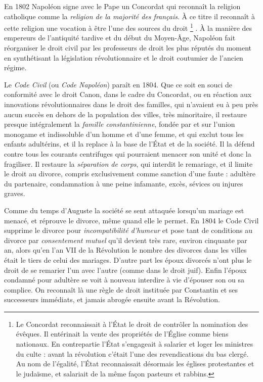 

 En 1802 Napoléon signe avec le Pape un Concordat qui reconnaît la religion catholique comme la \emph{religion de la majorité des français}. À ce titre il reconnaît à cette religion une vocation à être l'une des sources du droit%
\footnote{Le Concordat reconnaissait à l'État le droit de contrôler la nomination des évêques. Il entérinait la vente des propriétés de l'Église comme biens nationaux. En contrepartie l'État s'engageait à salarier et loger les ministres du culte : avant la révolution c'était l'une des revendications du bas clergé. Au nom de l'égalité, l'État reconnaissait désormais les églises protestantes et le judaïsme, et salariait de la même façon pasteurs et rabbins.}%
. À la manière des empereurs de l'antiquité tardive et du début du Moyen-Âge, Napoléon fait réorganiser le droit civil par les professeurs de droit les plus réputés du moment en synthétisant la législation révolutionnaire et le droit coutumier de l'ancien régime. 

 Le \emph{Code Civil} (ou \emph{Code Napoléon}) paraît en 1804. Que ce soit en souci de conformité avec le droit Canon, dans le cadre du Concordat, ou en réaction aux innovations révolutionnaires dans le droit des familles, qui n'avaient eu à peu près aucun succès en dehors de la population des villes, très minoritaire, il restaure presque intégralement la \emph{famille constantinienne}, fondée par et sur l'union monogame et indissoluble d'un homme et d'une femme, et qui exclut tous les enfants adultérins, et il la replace à la base de l'État et de la société. Il la défend contre tous les courants centrifuges qui pourraient menacer son unité et donc la fragiliser. Il restaure la \emph{séparation de corps}, qui interdit le remariage, et il limite le droit au divorce, compris exclusivement comme sanction d'une faute : adultère du partenaire, condamnation à une peine infamante, excès, sévices ou injures graves. 

 Comme du temps d'Auguste la société se sent attaquée lorsqu'un mariage est menacé, et réprouve le divorce, même quand elle le permet. En 1804 le Code Civil supprime le divorce pour \emph{incompatibilité d'humeur} et pose tant de conditions au divorce par \emph{consentement mutuel} qu'il devient très rare, environ cinquante par an, alors qu'en l'an VII de la Révolution le nombre des divorces dans les villes était le tiers de celui des mariages. D'autre part les époux divorcés n'ont plus le droit de se remarier l'un avec l'autre (comme dans le droit juif). Enfin l'époux condamné pour adultère se voit à nouveau interdire à vie d'épouser son ou sa complice. On reconnaît là une règle de droit instituée par Constantin et ses successeurs immédiats, et jamais abrogée ensuite avant la Révolution.

